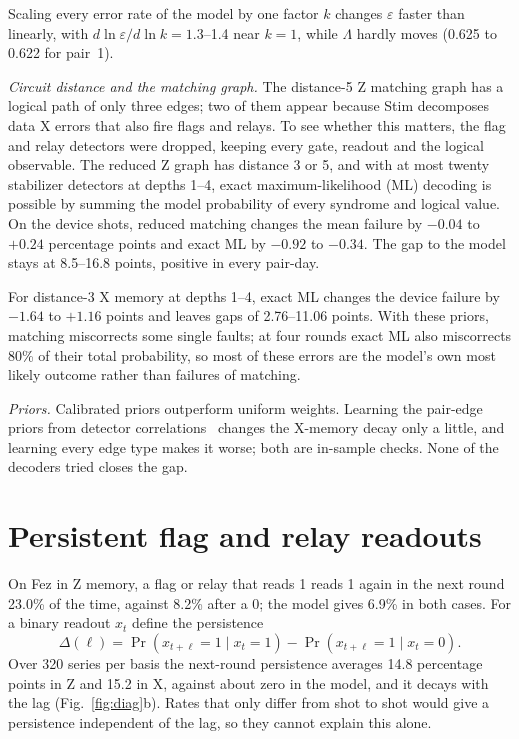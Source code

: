 \documentclass[aps,pra,reprint,nofootinbib,longbibliography,floatfix]{revtex4-2}
\newcommand{\eps}{\varepsilon}
\begin{document}
Scaling every error rate of the model by one factor $k$ changes $\eps$ faster than linearly, with $d\ln\eps/d\ln k = 1.3$--1.4 near $k=1$, while $\Lambda$ hardly moves (0.625 to 0.622 for pair~1).

\textit{Circuit distance and the matching graph.}
The distance-5 Z matching graph has a logical path of only three edges; two of them appear because Stim decomposes data X errors that also fire flags and relays.
To see whether this matters, the flag and relay detectors were dropped, keeping every gate, readout and the logical observable.
The reduced Z graph has distance 3 or 5, and with at most twenty stabilizer detectors at depths 1--4, exact maximum-likelihood (ML) decoding is possible by summing the model probability of every syndrome and logical value.
On the device shots, reduced matching changes the mean failure by $-0.04$ to $+0.24$ percentage points and exact ML by $-0.92$ to $-0.34$.
The gap to the model stays at 8.5--16.8 points, positive in every pair-day.

For distance-3 X memory at depths 1--4, exact ML changes the device failure by $-1.64$ to $+1.16$ points and leaves gaps of 2.76--11.06 points.
With these priors, matching miscorrects some single faults; at four rounds exact ML also miscorrects 80\% of their total probability, so most of these errors are the model's own most likely outcome rather than failures of matching.

\textit{Priors.}
Calibrated priors outperform uniform weights.
Learning the pair-edge priors from detector correlations~\cite{google2021exponential} changes the X-memory decay only a little, and learning every edge type makes it worse; both are in-sample checks.
None of the decoders tried closes the gap.

\section{Persistent flag and relay readouts}

On Fez in Z memory, a flag or relay that reads 1 reads 1 again in the next round 23.0\% of the time, against 8.2\% after a 0; the model gives 6.9\% in both cases.
For a binary readout $x_t$ define the persistence
\begin{equation}
\Delta(\ell) = \Pr(x_{t+\ell}=1 \mid x_t=1) - \Pr(x_{t+\ell}=1 \mid x_t=0).
\label{eq:persistence}
\end{equation}
Over 320 series per basis the next-round persistence averages 14.8 percentage points in Z and 15.2 in X, against about zero in the model, and it decays with the lag (Fig.~\ref{fig:diag}b).
Rates that only differ from shot to shot would give a persistence independent of the lag, so they cannot explain this alone.
\end{document}
